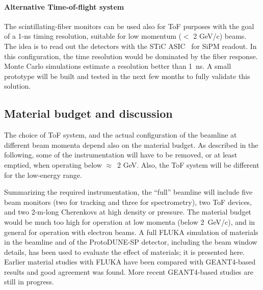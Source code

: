 \paragraph{Alternative Time-of-flight system}
The  scintillating-fiber monitors can be used also for ToF purposes with the goal of a 1-ns timing resolution, suitable for low momentum ($<$ 2 GeV/c) beams. 
The idea is to read out the detectors with the STiC ASIC~\cite{STIC} for SiPM readout. 
In this configuration, the time resolution would be dominated by the fiber response. Monte Carlo simulations estimate a resolution better than 1~ns. 
A small prototype will be built and tested in the next few months to fully validate this solution.

\subsection{Material budget and discussion}
\label{beam-material-budget}

The choice of ToF system, and the actual configuration of the beamline at different beam momenta  depend also on the material budget. 
As described in the following, some of the instrumentation will have to be removed, or at least emptied, when operating below $\approx$~2 GeV. Also, the ToF system will be different for the low-energy range.

Summarizing %
the required instrumentation, the ``full'' beamline will  include
 five beam monitors (two for tracking and three for spectrometry), two ToF devices, and two 2-m-long Cherenkovs at high density or pressure. The material budget would be much too high for operation at low momenta (below 2~GeV/c),  and in general for operation with electron beams.  
A full FLUKA\cite{fluka05,Fluka15}  simulation of materials in the beamline and of the ProtoDUNE-SP detector, including the beam window details, has been used to evaluate the effect of materials; it is presented here. 
Earlier material studies with FLUKA have been compared with GEANT4-based results and good agreement was found. More recent GEANT4-based studies are still in progress.

